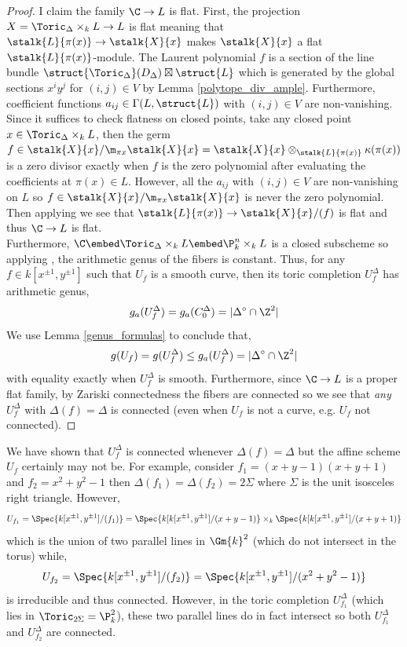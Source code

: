 \begin{proof}
I claim the family $\C \to L$ is flat. First, the projection $X = \Toric_{\Delta} \times_k L \to L$ is flat meaning that $\stalk{L}{\pi(x)} \to \stalk{X}{x}$ makes $\stalk{X}{x}$ a flat $\stalk{L}{\pi(x)}$-module. The Laurent polynomial $f$ is a section of the line bundle $\struct{\Toric_\Delta}(D_\Delta) \boxtimes \struct{L}$ which is generated by the global sections $x^i y^j$ for $(i,j) \in V$ by Lemma \ref{polytope_div_ample}. Furthermore, coefficient functions $a_{ij} \in \Gamma(L, \struct{L})$ with $(i,j) \in V$ are non-vanishing. Since it suffices to check flatness on closed points, take any closed point $x \in \Toric_\Delta \times_k L$, then the germ $f \in \stalk{X}{x} / \m_{\pi{x}} \stalk{X}{x} = \stalk{X}{x}\otimes_{\stalk{L}{\pi(x)}} \kappa(\pi(x))$ is a zero divisor exactly when $f$ is the zero polynomial after evaluating the coefficients at $\pi(x) \in L$. However, all the $a_{ij}$ with $(i, j) \in V$ are non-vanishing on $L$ so $f \in \stalk{X}{x} / \m_{\pi{x}} \stalk{X}{x}$ is never the zero polynomial. Then applying \cite[\href{https://stacks.math.columbia.edu/tag/046Z}{Tag 046Z}]{stacks-project} we see that $\stalk{L}{\pi(x)} \to \stalk{X}{x}/(f)$ is flat and thus $\C \to L$ is flat.
\bigskip\\
Furthermore, $\C \embed \Toric_\Delta \times_k L\embed \P^n_k \times_k L$ is a closed subscheme so applying \cite[Thm. III.9.10]{har}, the arithmetic genus of the fibers is constant. Thus, for any $f \in k[x^{\pm 1}, y^{\pm 1}]$ such that $U_f$ is a smooth curve, then its toric completion $U_f^\Delta$ has arithmetic genus,
\[ g_a(U_f^\Delta) = g_a(C_0^\Delta) = | \Delta^\circ \cap \Z^2 | \]
We use Lemma \ref{genus_formulas} to conclude that,
\[ g(U_f) = g(U_f^\Delta) \le g_a(U_f^\Delta) = | \Delta^\circ \cap \Z^2 | \]
with equality exactly when $U_f^\Delta$ is smooth. Furthermore, since $\C \to L$ is a proper flat family, by Zariski connectedness the fibers are connected so we see that \textit{any} $U_f^\Delta$ with $\Delta(f) = \Delta$ is connected (even when $U_f$ is not a curve, e.g. $U_f$ not connected).
\end{proof}

\begin{rmk}
We have shown that $U_f^\Delta$ is connected whenever $\Delta(f) = \Delta$ but the affine scheme $U_f$ certainly may not be. For example, consider $f_1 = (x + y - 1)(x + y + 1)$ and $f_2 = x^2 + y^2 - 1$ then $\Delta(f_1) = \Delta(f_2) = 2 \Sigma$ where $\Sigma$ is the unit isosceles right triangle. However, 
\[ U_{f_1} = \Spec{k[x^{\pm 1}, y^{\pm 1}]/(f_1)} = \Spec{k[k[x^{\pm 1}, y^{\pm 1}]/(x + y - 1)} \times_k \Spec{k[k[x^{\pm 1}, y^{\pm 1}]/(x + y + 1)} \]
which is the union of two parallel lines in $\Gm{k}^2$ (which do not intersect in the torus) while,
\[ U_{f_2} = \Spec{k[x^{\pm 1}, y^{\pm 1}]/(f_2)} = \Spec{k[x^{\pm 1}, y^{\pm 1}]/(x^2 + y^2 - 1)} \]
is irreducible and thus connected. However, in the toric completion $U_{f_1}^\Delta$ (which lies in $\Toric_{2 \Sigma} = \P^2_k$), these two parallel lines do in fact intersect so both $U_{f_1}^\Delta$ and $U_{f_2}^\Delta$ are connected.
\end{rmk}


